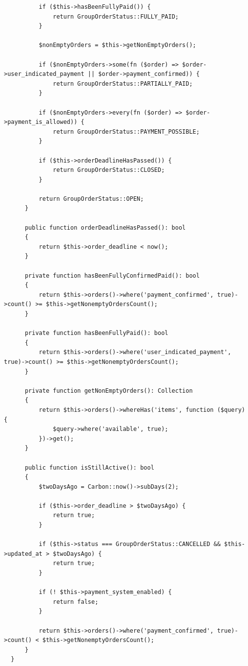 \begin{verbatim}
          if ($this->hasBeenFullyPaid()) {
              return GroupOrderStatus::FULLY_PAID;
          }
  
          $nonEmptyOrders = $this->getNonEmptyOrders();
  
          if ($nonEmptyOrders->some(fn ($order) => $order->user_indicated_payment || $order->payment_confirmed)) {
              return GroupOrderStatus::PARTIALLY_PAID;
          }
  
          if ($nonEmptyOrders->every(fn ($order) => $order->payment_is_allowed)) {
              return GroupOrderStatus::PAYMENT_POSSIBLE;
          }
  
          if ($this->orderDeadlineHasPassed()) {
              return GroupOrderStatus::CLOSED;
          }
  
          return GroupOrderStatus::OPEN;
      }
  
      public function orderDeadlineHasPassed(): bool
      {
          return $this->order_deadline < now();
      }
  
      private function hasBeenFullyConfirmedPaid(): bool
      {
          return $this->orders()->where('payment_confirmed', true)->count() >= $this->getNonemptyOrdersCount();
      }
  
      private function hasBeenFullyPaid(): bool
      {
          return $this->orders()->where('user_indicated_payment', true)->count() >= $this->getNonemptyOrdersCount();
      }
  
      private function getNonEmptyOrders(): Collection
      {
          return $this->orders()->whereHas('items', function ($query) {
              $query->where('available', true);
          })->get();
      }
  
      public function isStillActive(): bool
      {
          $twoDaysAgo = Carbon::now()->subDays(2);
  
          if ($this->order_deadline > $twoDaysAgo) {
              return true;
          }
  
          if ($this->status === GroupOrderStatus::CANCELLED && $this->updated_at > $twoDaysAgo) {
              return true;
          }
  
          if (! $this->payment_system_enabled) {
              return false;
          }
  
          return $this->orders()->where('payment_confirmed', true)->count() < $this->getNonemptyOrdersCount();
      }
  }
\end{verbatim}
\label{lst:groupordermodel}

